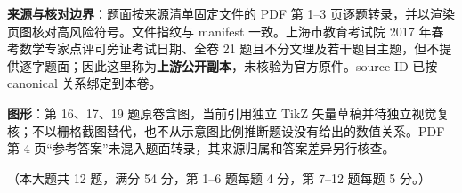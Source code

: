 

\begin{gktip}
\textbf{来源与核对边界}：题面按来源清单固定文件的 PDF 第 1–3 页逐题转录，并以渲染页图核对高风险符号。文件指纹与 manifest 一致。上海市教育考试院 2017 年春考数学专家点评可旁证考试日期、全卷 21 题且不分文理及若干题目主题，但不提供逐字题面；因此这里称为\textbf{上游公开副本}，未核验为官方原件。source ID 已按 canonical 关系绑定到本卷。

\textbf{图形}：第 16、17、19 题原卷含图，当前引用独立 TikZ 矢量草稿并待独立视觉复核；不以栅格截图替代，也不从示意图比例推断题设没有给出的数值关系。PDF 第 4 页“参考答案”未混入题面转录，其来源归属和答案差异另行核查。
\end{gktip}


（本大题共 12 题，满分 54 分，第 1–6 题每题 4 分，第 7–12 题每题 5 分。）

